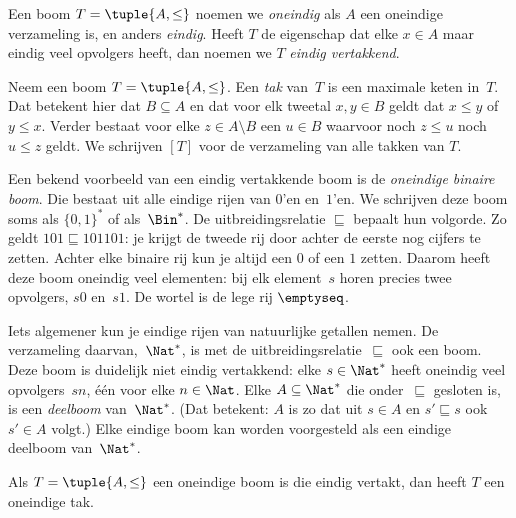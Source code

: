 \documentclass[openany]{memoir}
\begin{document}
\begin{defn}
Een boom $T = \tuple{A, \le}$ noemen we \emph{oneindig} als $A$ een
oneindige verzameling is, en anders \emph{eindig}. Heeft $T$ de
eigenschap dat elke $x \in A$ maar eindig veel opvolgers heeft, dan
noemen we $T$ \emph{eindig vertakkend}.
\end{defn}

\begin{defn}[Takken]
Neem een boom $T = \tuple{A, \le}$. Een \emph{tak} van~$T$ is een
maximale keten in~$T$. Dat betekent hier dat $B \subseteq A$ en dat
voor elk tweetal $x, y \in B$ geldt dat $x \le y$ of $y \le x$.
Verder bestaat voor elke $z \in A \setminus B$ een $u \in B$ waarvoor
noch $z \le u$ noch $u \le z$ geldt.
%
We schrijven $[T]$ voor de verzameling van alle takken van $T$.
\end{defn}

\begin{ex}
Een bekend voorbeeld van een eindig vertakkende boom is de
\emph{oneindige binaire boom}. Die bestaat uit alle eindige rijen
van $0$'en en~$1$'en. We schrijven deze boom soms als $\{0,1\}^*$ of
als~$\Bin^*$. De uitbreidingsrelatie $\sqsubseteq$ bepaalt hun
volgorde. Zo geldt $101 \sqsubseteq 101101$: je krijgt de tweede rij
door achter de eerste nog cijfers te zetten. Achter elke binaire rij
kun je altijd een
$0$ of een $1$ zetten. Daarom heeft deze boom oneindig veel
elementen: bij elk element~$s$ horen precies twee opvolgers, $s0$
en~$s1$. De wortel is de lege rij $\emptyseq$.
\end{ex}

\begin{ex}
Iets algemener kun je eindige rijen van natuurlijke getallen nemen.
De verzameling daarvan,~$\Nat^*$, is met de
uitbreidingsrelatie~$\sqsubseteq$ ook een boom. Deze boom is duidelijk
niet eindig vertakkend: elke $s \in \Nat^*$ heeft oneindig veel
opvolgers~$sn$, één voor elke $n \in \Nat$. Elke
$A \subseteq \Nat^*$ die onder~$\sqsubseteq$ gesloten is, is een
\emph{deelboom} van~$\Nat^*$. (Dat betekent: $A$ is zo dat uit
$s \in A$ en $s' \sqsubseteq s$ ook $s' \in A$ volgt.) Elke eindige
boom kan worden voorgesteld als een eindige deelboom van~$\Nat^*$.
\end{ex}

\begin{prop}
Als $T = \tuple{A,\le}$ een oneindige boom is die eindig vertakt, dan
heeft $T$ een oneindige tak.
\end{prop}
\end{document}
